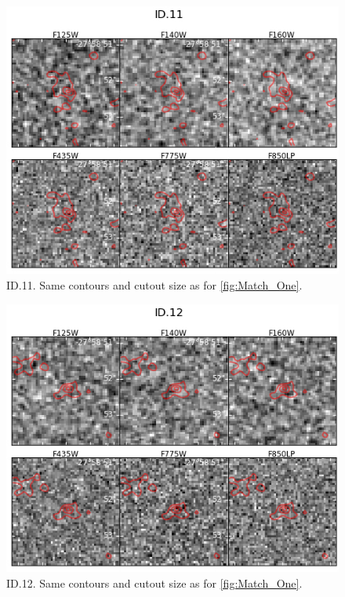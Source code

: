 \begin{figure}[tbp]
\centering \includegraphics[width=160mm]{Matched/ASPECS_Cutout_10.jpg}
\caption{ID.11. Same contours and cutout size as for \ref{fig:Match_One}.}
\label{fig:Match_Three}
\end{figure}

\begin{figure}[tbp]
\centering \includegraphics[width=160mm]{Matched/ASPECS_Cutout_11.jpg}
\caption{ID.12. Same contours and cutout size as for \ref{fig:Match_One}.}
\label{fig:Match_Three}
\end{figure}

